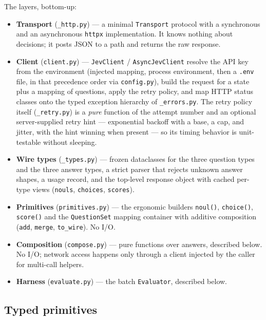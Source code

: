 \documentclass[
  english,
]{article}
\providecommand{\tightlist}{%
  \setlength{\itemsep}{0pt}\setlength{\parskip}{0pt}}
\begin{document}
The layers, bottom-up:

\begin{itemize}
\tightlist
\item
  \textbf{Transport} (\texttt{\_http.py}) --- a minimal
  \texttt{Transport} protocol with a synchronous and an asynchronous
  \texttt{httpx} implementation. It knows nothing about decisions; it
  posts JSON to a path and returns the raw response.
\item
  \textbf{Client} (\texttt{client.py}) --- \texttt{JevClient} /
  \texttt{AsyncJevClient} resolve the API key from the environment
  (injected mapping, process environment, then a \texttt{.env} file, in
  that precedence order via \texttt{config.py}), build the request for a
  state plus a mapping of questions, apply the retry policy, and map
  HTTP status classes onto the typed exception hierarchy of
  \texttt{\_errors.py}. The retry policy itself (\texttt{\_retry.py}) is
  a \emph{pure} function of the attempt number and an optional
  server-supplied retry hint --- exponential backoff with a base, a cap,
  and jitter, with the hint winning when present --- so its timing
  behavior is unit-testable without sleeping.
\item
  \textbf{Wire types} (\texttt{\_types.py}) --- frozen dataclasses for
  the three question types and the three answer types, a strict parser
  that rejects unknown answer shapes, a usage record, and the top-level
  response object with cached per-type views (\texttt{nouls},
  \texttt{choices}, \texttt{scores}).
\item
  \textbf{Primitives} (\texttt{primitives.py}) --- the ergonomic
  builders \texttt{noul()}, \texttt{choice()}, \texttt{score()} and the
  \texttt{QuestionSet} mapping container with additive composition
  (\texttt{add}, \texttt{merge}, \texttt{to\_wire}). No I/O.
\item
  \textbf{Composition} (\texttt{compose.py}) --- pure functions over
  answers, described below. No I/O; network access happens only through
  a client injected by the caller for multi-call helpers.
\item
  \textbf{Harness} (\texttt{evaluate.py}) --- the batch
  \texttt{Evaluator}, described below.
\end{itemize}

\subsection{Typed primitives}\label{typed-primitives}
\end{document}
